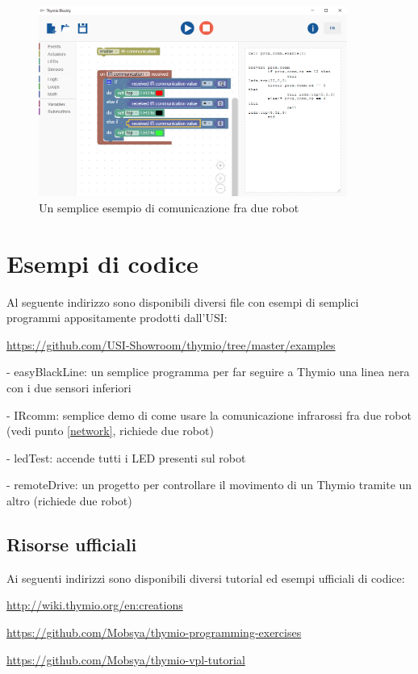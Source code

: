 \documentclass[12pt]{article}
\begin{document}
	\begin{figure}[H]
		\centering
		\includegraphics[width=0.9\textwidth]{img/blocklyIR2.png}
		\caption{Un semplice esempio di comunicazione fra due robot}
		\label{blocklyIR2}
	\end{figure}
	

\section{Esempi di codice}\label{usiRepo}
		
		Al seguente indirizzo sono disponibili diversi file con esempi di semplici programmi appositamente prodotti dall'USI:
		
		\url{https://github.com/USI-Showroom/thymio/tree/master/examples}
		
		
		- easyBlackLine: un semplice programma per far seguire a Thymio una linea nera con i due sensori inferiori
		
		- IRcomm: semplice demo di come usare la comunicazione infrarossi fra due robot (vedi punto \ref{network}, richiede due robot)
		
		- ledTest: accende tutti i LED presenti sul robot
		
		- remoteDrive: un progetto per controllare il movimento di un Thymio tramite un altro (richiede due robot)
		
		\newpage
		
	
	\subsection{Risorse ufficiali}
	
		Ai seguenti indirizzi sono disponibili diversi tutorial ed esempi ufficiali di codice:
	
		\url{http://wiki.thymio.org/en:creations}
		
		\url{https://github.com/Mobsya/thymio-programming-exercises}
		
		\url{https://github.com/Mobsya/thymio-vpl-tutorial}
	
	
\end{document}
